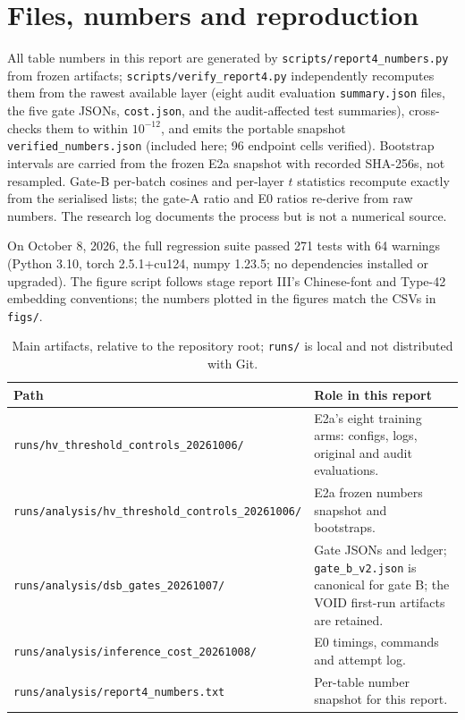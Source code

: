 \documentclass[11pt,a4paper]{article}
\newcommand{\code}[1]{\nolinkurl{#1}}
\begin{document}
\appendix
\section{Files, numbers and reproduction}

All table numbers in this report are generated by \code{scripts/report4\_numbers.py} from frozen artifacts; \code{scripts/verify\_report4.py} independently recomputes them from the rawest available layer (eight audit evaluation \code{summary.json} files, the five gate JSONs, \code{cost.json}, and the audit-affected test summaries), cross-checks them to within $10^{-12}$, and emits the portable snapshot \code{verified\_numbers.json} (included here; 96 endpoint cells verified). Bootstrap intervals are carried from the frozen E2a snapshot with recorded SHA-256s, not resampled. Gate-B per-batch cosines and per-layer $t$ statistics recompute exactly from the serialised lists; the gate-A ratio and E0 ratios re-derive from raw numbers. The research log\cite{findings} documents the process but is not a numerical source.

On October 8, 2026, the full regression suite passed 271 tests with 64 warnings (Python 3.10, torch 2.5.1+cu124, numpy 1.23.5; no dependencies installed or upgraded). The figure script follows stage report III's Chinese-font and Type-42 embedding conventions; the numbers plotted in the figures match the CSVs in \code{figs/}.

\begin{table}[H]
\centering\footnotesize
\caption{Main artifacts, relative to the repository root; \code{runs/} is local and not distributed with Git.}
\begin{tabularx}{\linewidth}{lY}\toprule
Path & Role in this report\\\midrule
\code{runs/hv\_threshold\_controls\_20261006/} & E2a's eight training arms: configs, logs, original and audit evaluations.\\
\code{runs/analysis/hv\_threshold\_controls\_20261006/} & E2a frozen numbers snapshot and bootstraps.\\
\code{runs/analysis/dsb\_gates\_20261007/} & Gate JSONs and ledger; \code{gate\_b\_v2.json} is canonical for gate B; the VOID first-run artifacts are retained.\\
\code{runs/analysis/inference\_cost\_20261008/} & E0 timings, commands and attempt log.\\
\code{runs/analysis/report4\_numbers.txt} & Per-table number snapshot for this report.\\\bottomrule
\end{tabularx}
\end{table}
\end{document}
